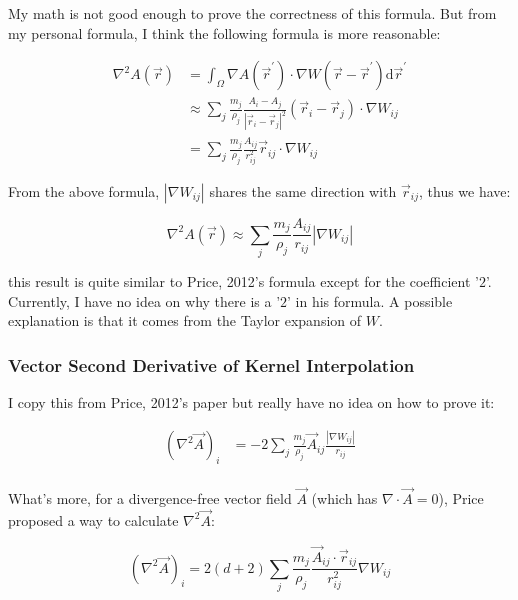 \documentclass[10pt, oneside]{article}
\begin{document}
My math is not good enough to prove the correctness of this formula. 
But from my personal formula, I think the following formula is more reasonable:

\begin{equation}
    \begin{aligned}
        \nabla^2 A(\vec{r})&= 
        \int_{\Omega} \nabla A(\vec{r}^\prime) \cdot \nabla W(\vec{r}- \vec{r}^\prime ) \mathrm{d}\vec{r}^\prime\\
        &\approx
        \sum_j \frac{m_j}{\rho_j} \frac{A_i-A_j}{|\vec{r}_i-\vec{r}_j|^2}
        (\vec{r}_i - \vec{r}_j)\cdot \nabla W_{ij}\\
        &=\sum_j \frac{m_j}{\rho_j}\frac{A_{ij}}{r_{ij}^2}\vec{r}_{ij}\cdot \nabla W_{ij}
    \end{aligned}
\end{equation}

From the above formula, $|\nabla W_{ij}|$ shares the same direction with $\vec{r}_{ij}$,
thus we have:

\begin{equation}
    \nabla^2 A(\vec{r})\approx
    \sum_j \frac{m_j}{\rho_j}\frac{A_{ij}}{r_{ij}}|\nabla W_{ij}|
\end{equation}

this result is quite similar to Price, 2012's formula except for the coefficient '$2$'.
Currently, I have no idea on why there is a '$2$' in his formula. 
A possible explanation is that it comes from the Taylor expansion of $W$.

\subsubsection{Vector Second Derivative of Kernel Interpolation}

I copy this from Price, 2012's paper but really have no idea on how to prove it:

\begin{equation}
    \begin{aligned}
        (\nabla^2 \vec{A})_i&=-2\sum_j \frac{m_j}{\rho_j}\vec{A}_{ij}\frac{|\nabla W_{ij}|}{r_{ij}}\\
    \end{aligned}
\end{equation}

What's more, for a divergence-free vector field $\vec{A}$ (which has $\nabla\cdot\vec{A}=0$), 
Price proposed a way to calculate $\nabla^2 \vec{A}$:

\begin{equation}
    (\nabla^2 \vec{A})_i=2(d+2)\sum_{j} 
    \frac{m_j}{\rho _j} \frac{\vec{A}_{ij}\cdot \vec{r}_{ij}}{r_{ij}^2}\nabla W_{ij}
\end{equation}
\end{document}
